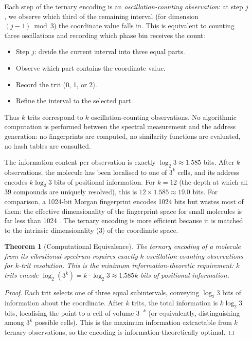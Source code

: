 \documentclass[11pt,a4paper]{article}
\newtheorem{theorem}{Theorem}[section]
\theoremstyle{definition}
\theoremstyle{remark}
\begin{document}
Each step of the ternary encoding is an \emph{oscillation-counting observation}: at step $j$, we observe which third of the remaining interval (for dimension $(j-1) \bmod 3$) the coordinate value falls in. This is equivalent to counting three oscillations and recording which phase bin receives the count:

\begin{itemize}[nosep]
\item Step $j$: divide the current interval into three equal parts.
\item Observe which part contains the coordinate value.
\item Record the trit (0, 1, or 2).
\item Refine the interval to the selected part.
\end{itemize}

Thus $k$ trits correspond to $k$ oscillation-counting observations. No algorithmic computation is performed between the spectral measurement and the address generation: no fingerprints are computed, no similarity functions are evaluated, no hash tables are consulted.

The information content per observation is exactly $\log_2 3 \approx 1.585$ bits. After $k$ observations, the molecule has been localised to one of $3^k$ cells, and its address encodes $k \log_2 3$ bits of positional information. For $k = 12$ (the depth at which all 39 compounds are uniquely resolved), this is $12 \times 1.585 \approx 19.0$ bits. For comparison, a 1024-bit Morgan fingerprint encodes 1024 bits but wastes most of them: the effective dimensionality of the fingerprint space for small molecules is far less than 1024 \citep{riniker2013}. The ternary encoding is more efficient because it is matched to the intrinsic dimensionality (3) of the coordinate space.

\begin{theorem}[Computational Equivalence]
\label{thm:computational_equiv}
The ternary encoding of a molecule from its vibrational spectrum requires exactly $k$ oscillation-counting observations for $k$-trit resolution. This is the minimum information-theoretic requirement: $k$ trits encode $\log_2(3^k) = k \cdot \log_2 3 \approx 1.585k$ bits of positional information.
\end{theorem}

\begin{proof}
Each trit selects one of three equal subintervals, conveying $\log_2 3$ bits of information about the coordinate. After $k$ trits, the total information is $k \log_2 3$ bits, localising the point to a cell of volume $3^{-k}$ (or equivalently, distinguishing among $3^k$ possible cells). This is the maximum information extractable from $k$ ternary observations, so the encoding is information-theoretically optimal.
\end{proof}
\end{document}
